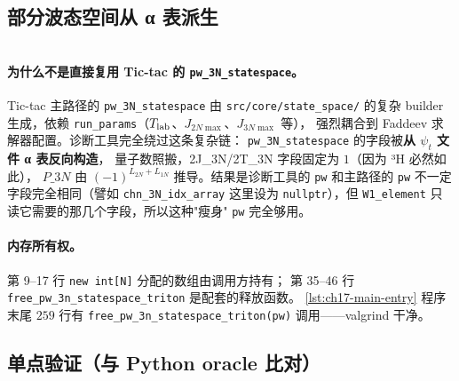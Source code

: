 \subsection{部分波态空间从 α 表派生}
\label{subsec:ch17-code-build}

\begin{lstlisting}[style=cpp, caption={\texttt{build\_pw\_3n\_statespace.cpp} —— 从 α 表构造 \texttt{pw\_3N\_statespace} (lines 1--46)}, label={lst:ch17-build-pw-statespace}]
\end{lstlisting}


\paragraph{为什么不是直接复用 Tic-tac 的 \texttt{pw\_3N\_statespace}。}
Tic-tac 主路径的 \texttt{pw\_3N\_statespace} 由
\texttt{src/core/state\_space/} 的复杂 builder 生成，依赖
\texttt{run\_params}（\({T_{\text{lab}}}\)、\(J_{2N\max}\)、\(J_{3N\max}\) 等），
强烈耦合到 Faddeev 求解器配置。诊断工具完全绕过这条复杂链：
\texttt{pw\_3N\_statespace} 的字段被\textbf{从 \(\psi_t\) 文件 α 表反向构造}，
量子数照搬，2J\_3N/2T\_3N 字段固定为 \(1\)（因为 ³H 必然如此），
\(P\_3N\) 由 \((-1)^{L_{2N}+L_{1N}}\) 推导。结果是诊断工具的 \texttt{pw}
和主路径的 \texttt{pw} 不一定字段完全相同（譬如
\texttt{chn\_3N\_idx\_array} 这里设为 \texttt{nullptr}），但
\texttt{W1\_element} 只读它需要的那几个字段，所以这种"瘦身"
\texttt{pw} 完全够用。

\paragraph{内存所有权。}
第 9--17 行 \texttt{new int[N]} 分配的数组由调用方持有；
第 35--46 行 \texttt{free\_pw\_3n\_statespace\_triton} 是配套的释放函数。
\cref{lst:ch17-main-entry} 程序末尾 \(259\) 行有 \texttt{free\_pw\_3n\_statespace\_triton(pw)}
调用——valgrind 干净。

\subsection{单点验证（与 Python oracle 比对）}
\label{subsec:ch17-code-singlepoint}

\begin{lstlisting}[style=cpp, caption={Task-3 / Task-4 / Task-5 单点验证 (lines 88--156)}, label={lst:ch17-singlepoint-check}]
\end{lstlisting}


